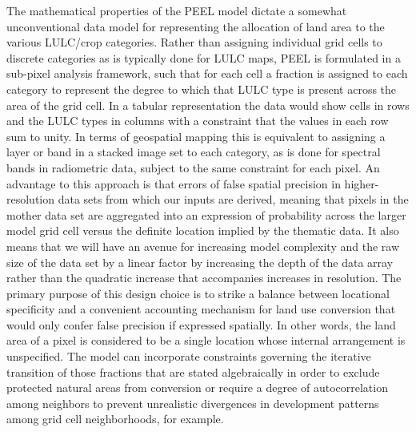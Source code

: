 The mathematical properties of the PEEL model dictate a somewhat
unconventional data model for representing the allocation of land area
to the various LULC\slash crop categories.  Rather than assigning individual
grid cells to discrete categories as is typically done for LULC maps,
PEEL is formulated in a sub-pixel analysis framework, such that for
each cell a fraction is assigned to each category to represent the
degree to which that LULC type is present across the area of the grid
cell.  In a tabular representation the data would show cells in rows
and the LULC types in columns with a constraint that the values in
each row sum to unity.  In terms of geospatial mapping this is
equivalent to assigning a layer or band in a stacked image set to each
category, as is done for spectral bands in radiometric data, subject
to the same constraint for each pixel.  An advantage to this approach
is that errors of false spatial precision in higher-resolution data
sets from which our inputs are derived, meaning that pixels in the
mother data set are aggregated into an expression of probability
across the larger model grid cell versus the definite location implied
by the thematic data.  It also means that we will have an avenue for
increasing model complexity and the raw size of the data set by a
linear factor by increasing the depth of the data array rather than
the quadratic increase that accompanies increases in resolution.  The
primary purpose of this design choice is to strike a balance between
locational specificity and a convenient accounting mechanism for land
use conversion that would only confer false precision if expressed
spatially.  In other words, the land area of a pixel is considered to
be a single location whose internal arrangement is unspecified.  The
model can incorporate constraints governing the iterative transition
of those fractions that are stated algebraically in order to exclude
protected natural areas from conversion or require a degree of
autocorrelation among neighbors to prevent unrealistic divergences in
development patterns among grid cell neighborhoods, for example.

